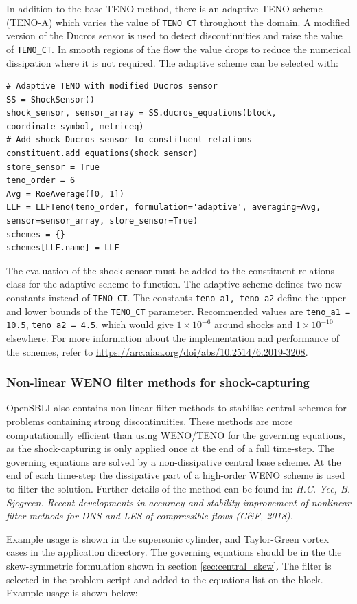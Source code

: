 \documentclass[11pt]{article}
\begin{document}
In addition to the base TENO method, there is an adaptive TENO scheme (TENO-A) which varies the value of \verb|TENO_CT| throughout the domain. A modified version of the Ducros sensor is used to detect discontinuities and raise the value of \verb|TENO_CT|. In smooth regions of the flow the value drops to reduce the numerical dissipation where it is not required. The adaptive scheme can be selected with:
\begin{lstlisting}
# Adaptive TENO with modified Ducros sensor
SS = ShockSensor()
shock_sensor, sensor_array = SS.ducros_equations(block, coordinate_symbol, metriceq)
# Add shock Ducros sensor to constituent relations
constituent.add_equations(shock_sensor)
store_sensor = True
teno_order = 6
Avg = RoeAverage([0, 1])
LLF = LLFTeno(teno_order, formulation='adaptive', averaging=Avg, sensor=sensor_array, store_sensor=True)
schemes = {}
schemes[LLF.name] = LLF
\end{lstlisting}
The evaluation of the shock sensor must be added to the constituent relations class for the adaptive scheme to function. The adaptive scheme defines two new constants instead of \verb|TENO_CT|. The constants \verb|teno_a1, teno_a2| define the upper and lower bounds of the \verb|TENO_CT| parameter. Recommended values are \verb|teno_a1 = 10.5|, \verb|teno_a2 = 4.5|, which would give $1\times 10^{-6}$ around shocks and $1\times 10^{-10}$ elsewhere. For more information about the implementation and performance of the schemes, refer to \url{https://arc.aiaa.org/doi/abs/10.2514/6.2019-3208}.

\subsubsection{Non-linear WENO filter methods for shock-capturing}
OpenSBLI also contains non-linear filter methods to stabilise central schemes for problems containing strong discontinuities. These methods are more computationally efficient than using WENO/TENO for the governing equations, as the shock-capturing is only applied once at the end of a full time-step. The governing equations are solved by a non-dissipative central base scheme. At the end of each time-step the dissipative part of a high-order WENO scheme is used to filter the solution. Further details of the method can be found in: \textit{H.C. Yee, B. Sjogreen. Recent developments in accuracy and stability improvement of nonlinear filter methods for DNS and LES of compressible flows (C\&F, 2018).}

Example usage is shown in the supersonic cylinder, and Taylor-Green vortex cases in the application directory. The governing equations should be in the the skew-symmetric formulation shown in section \ref{sec:central_skew}. The filter is selected in the problem script and added to the equations list on the block. Example usage is shown below:
\end{document}
